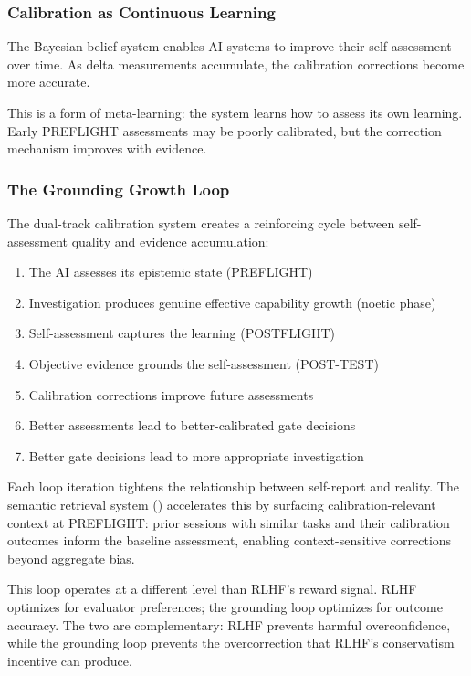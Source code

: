 \subsubsection{Calibration as Continuous Learning}

The Bayesian belief system enables AI systems to improve their self-assessment over time. As delta measurements accumulate, the calibration corrections become more accurate.

This is a form of meta-learning: the system learns how to assess its own learning. Early PREFLIGHT assessments may be poorly calibrated, but the correction mechanism improves with evidence.

\subsubsection{The Grounding Growth Loop}

The dual-track calibration system creates a reinforcing cycle between self-assessment quality and evidence accumulation:

\begin{enumerate}
    \item The AI assesses its epistemic state (PREFLIGHT)
    \item Investigation produces genuine effective capability growth (noetic phase)
    \item Self-assessment captures the learning (POSTFLIGHT)
    \item Objective evidence grounds the self-assessment (POST-TEST)
    \item Calibration corrections improve future assessments
    \item Better assessments lead to better-calibrated gate decisions
    \item Better gate decisions lead to more appropriate investigation
\end{enumerate}

Each loop iteration tightens the relationship between self-report and reality. The semantic retrieval system () accelerates this by surfacing calibration-relevant context at PREFLIGHT: prior sessions with similar tasks and their calibration outcomes inform the baseline assessment, enabling context-sensitive corrections beyond aggregate bias.

This loop operates at a different level than RLHF's reward signal. RLHF optimizes for evaluator preferences; the grounding loop optimizes for outcome accuracy. The two are complementary: RLHF prevents harmful overconfidence, while the grounding loop prevents the overcorrection that RLHF's conservatism incentive can produce.

